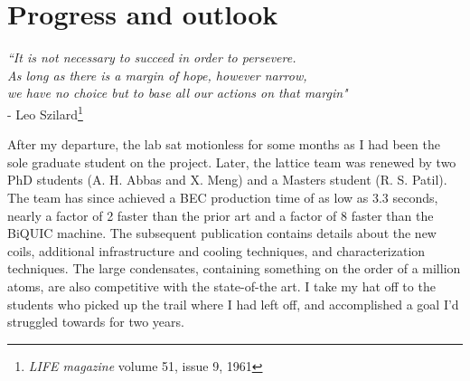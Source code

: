 



\section{Progress and outlook}
	
	\begin{flushright}
	\emph{``It is not necessary to succeed in order to persevere.\\
	As long as there is a margin of hope, however narrow, \\
	we have no choice but to base all our actions on that margin"}\\
	- Leo Szilard\footnote{\emph{LIFE magazine} volume 51, issue 9, 1961 }\\
	\end{flushright}


	After my departure, the lab sat motionless for some months as I had been the sole graduate student on the project.
	Later, the \mhe lattice team was renewed by two PhD students (A. H.	Abbas and X. Meng) and a Masters student (R. S. Patil).
	The team has since achieved a BEC production time of as low as 3.3 seconds, nearly a factor of 2 faster than the prior art \cite{Bouton15} and a factor of 8 faster than the BiQUIC machine.
	The subsequent publication \cite{Abbas21} contains details about the new coils, additional infrastructure and cooling techniques, and characterization techniques.
	The large condensates, containing something on the order of a million atoms, are also competitive with the state-of-the art.
	I take my hat off to the students who picked up the trail where I had left off, and accomplished a goal I'd struggled towards for two years.


